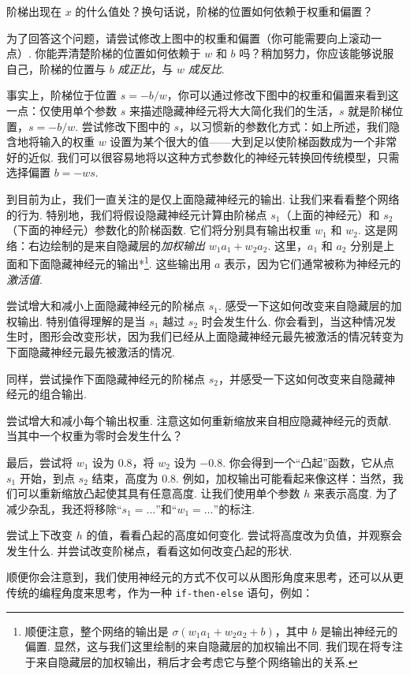 阶梯出现在 $x$ 的什么值处？换句话说，阶梯的位置如何依赖于权重和偏置？

为了回答这个问题，请尝试修改上图中的权重和偏置（你可能需要向上滚动一点）. 你能弄清楚阶梯的位置如何依赖于 $w$ 和 $b$ 吗？稍加努力，你应该能够说服自己，阶梯的位置与 $b$ \emph{成正比}，与 $w$ \emph{成反比}.

事实上，阶梯位于位置 $s = -b/w$，你可以通过修改下图中的权重和偏置来看到这一点：仅使用单个参数 $s$ 来描述隐藏神经元将大大简化我们的生活，$s$ 就是阶梯位置，$s = -b/w$. 尝试修改下图中的 $s$，以习惯新的参数化方式：如上所述，我们隐含地将输入的权重 $w$ 设置为某个很大的值——大到足以使阶梯函数成为一个非常好的近似. 我们可以很容易地将以这种方式参数化的神经元转换回传统模型，只需选择偏置 $b = -w s$.

到目前为止，我们一直关注的是仅上面隐藏神经元的输出. 让我们来看看整个网络的行为. 特别地，我们将假设隐藏神经元计算由阶梯点 $s_1$（上面的神经元）和 $s_2$（下面的神经元）参数化的阶梯函数. 它们将分别具有输出权重 $w_1$ 和 $w_2$. 这是网络：右边绘制的是来自隐藏层的\emph{加权输出} $w_1 a_1 + w_2 a_2$. 这里，$a_1$ 和 $a_2$ 分别是上面和下面隐藏神经元的输出*\footnote{顺便注意，整个网络的输出是 $\sigma(w_1 a_1+w_2 a_2 + b)$，其中 $b$ 是输出神经元的偏置. 显然，这与我们这里绘制的来自隐藏层的加权输出不同. 我们现在将专注于来自隐藏层的加权输出，稍后才会考虑它与整个网络输出的关系.}. 这些输出用 $a$ 表示，因为它们通常被称为神经元的\emph{激活值}.

尝试增大和减小上面隐藏神经元的阶梯点 $s_1$. 感受一下这如何改变来自隐藏层的加权输出. 特别值得理解的是当 $s_1$ 越过 $s_2$ 时会发生什么. 你会看到，当这种情况发生时，图形会改变形状，因为我们已经从上面隐藏神经元最先被激活的情况转变为下面隐藏神经元最先被激活的情况.

同样，尝试操作下面隐藏神经元的阶梯点 $s_2$，并感受一下这如何改变来自隐藏神经元的组合输出.

尝试增大和减小每个输出权重. 注意这如何重新缩放来自相应隐藏神经元的贡献. 当其中一个权重为零时会发生什么？

最后，尝试将 $w_1$ 设为 $0.8$，将 $w_2$ 设为 $-0.8$. 你会得到一个``凸起''函数，它从点 $s_1$ 开始，到点 $s_2$ 结束，高度为 $0.8$. 例如，加权输出可能看起来像这样：当然，我们可以重新缩放凸起使其具有任意高度. 让我们使用单个参数 $h$ 来表示高度. 为了减少杂乱，我还将移除``$s_1 = \ldots$''和``$w_1 = \ldots$''的标注.

尝试上下改变 $h$ 的值，看看凸起的高度如何变化. 尝试将高度改为负值，并观察会发生什么. 并尝试改变阶梯点，看看这如何改变凸起的形状.

顺便你会注意到，我们使用神经元的方式不仅可以从图形角度来思考，还可以从更传统的编程角度来思考，作为一种 \texttt{if-then-else} 语句，例如：


